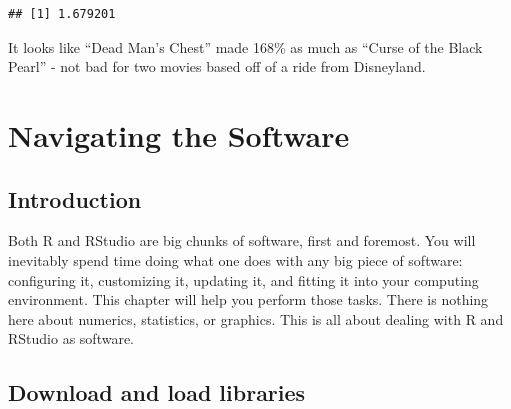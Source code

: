 \documentclass[
]{book}
\newenvironment{Shaded}{\begin{snugshade}}{\end{snugshade}}
\newcommand{\CommentTok}[1]{\textcolor[rgb]{0.56,0.35,0.01}{\textit{#1}}}
\newcommand{\ControlFlowTok}[1]{\textcolor[rgb]{0.13,0.29,0.53}{\textbf{#1}}}
\newcommand{\KeywordTok}[1]{\textcolor[rgb]{0.13,0.29,0.53}{\textbf{#1}}}
\newcommand{\NormalTok}[1]{#1}
\newcommand{\OperatorTok}[1]{\textcolor[rgb]{0.81,0.36,0.00}{\textbf{#1}}}
\newcommand{\StringTok}[1]{\textcolor[rgb]{0.31,0.60,0.02}{#1}}
\begin{document}
\begin{verbatim}
## [1] 1.679201
\end{verbatim}

It looks like ``Dead Man's Chest'' made 168\% as much as ``Curse of the Black Pearl'' - not bad for two movies based off of a ride from Disneyland.

\hypertarget{NavigatingTheSoftware}{%
\chapter{Navigating the Software}\label{NavigatingTheSoftware}}

\hypertarget{introduction}{%
\section*{Introduction}\label{introduction}}

Both R and RStudio are big chunks of software, first and foremost. You will inevitably
spend time doing what one does with any big piece of software:
configuring it, customizing it, updating it, and fitting it into your
computing environment. This chapter will help you perform those tasks.
There is nothing here about numerics, statistics, or graphics. This is
all about dealing with R and RStudio as software.

\hypertarget{download-and-load-libraries}{%
\section*{Download and load libraries}\label{download-and-load-libraries}}

\begin{Shaded}
\end{Shaded}
\end{document}
